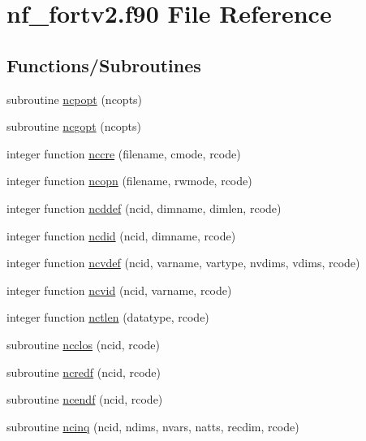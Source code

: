 \hypertarget{nf__fortv2_8f90}{}\section{nf\+\_\+fortv2.\+f90 File Reference}
\label{nf__fortv2_8f90}
\subsection*{Functions/\+Subroutines}
\begin{DoxyCompactItemize}
\item 
subroutine \hyperlink{nf__fortv2_8f90_aa99b1352748c769427ead3bfaf123fff}{ncpopt} (ncopts)
\item 
subroutine \hyperlink{nf__fortv2_8f90_a4fe1ac0350a63230cc17e880d496efa3}{ncgopt} (ncopts)
\item 
integer function \hyperlink{nf__fortv2_8f90_a395384eea56bdad4a53b55df6d6e78d2}{nccre} (filename, cmode, rcode)
\item 
integer function \hyperlink{nf__fortv2_8f90_a43dce57f3c98cba43a7394b48ecd3184}{ncopn} (filename, rwmode, rcode)
\item 
integer function \hyperlink{nf__fortv2_8f90_a78171f3b2ee4a6763e764c357d57836e}{ncddef} (ncid, dimname, dimlen, rcode)
\item 
integer function \hyperlink{nf__fortv2_8f90_ac39b06f8d9b6ca78ff6073608ac25115}{ncdid} (ncid, dimname, rcode)
\item 
integer function \hyperlink{nf__fortv2_8f90_a7121e237ce771e26edb350028c22f37c}{ncvdef} (ncid, varname, vartype, nvdims, vdims, rcode)
\item 
integer function \hyperlink{nf__fortv2_8f90_aea3eb70885317451ef241b6feacb8893}{ncvid} (ncid, varname, rcode)
\item 
integer function \hyperlink{nf__fortv2_8f90_aa66c92465ffab79785ec2fcda51321c1}{nctlen} (datatype, rcode)
\item 
subroutine \hyperlink{nf__fortv2_8f90_a03f16672189e09514f5df0a9d72e6859}{ncclos} (ncid, rcode)
\item 
subroutine \hyperlink{nf__fortv2_8f90_a162a5ab1076c10c2228e36ee9ff00677}{ncredf} (ncid, rcode)
\item 
subroutine \hyperlink{nf__fortv2_8f90_a0397fd550c269ff18340d1786e34d6f6}{ncendf} (ncid, rcode)
\item 
subroutine \hyperlink{nf__fortv2_8f90_aeb39546c2eeb1bc23ac957a2388fc56b}{ncinq} (ncid, ndims, nvars, natts, recdim, rcode)
\item 

\end{DoxyCompactItemize}
